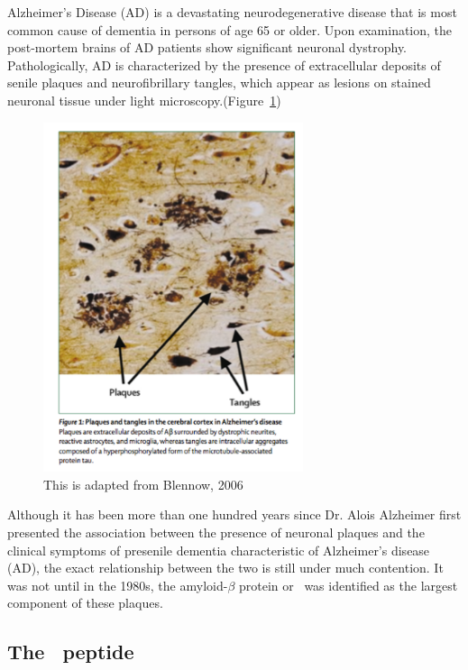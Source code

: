 Alzheimer's Disease (AD) is a devastating neurodegenerative disease that is most common cause of dementia in persons of age 65 or older.  Upon examination, the post-mortem brains of AD patients show significant neuronal dystrophy.  Pathologically, AD is characterized by the presence of extracellular deposits of senile plaques and neurofibrillary tangles, which appear as lesions on stained neuronal tissue under light microscopy.(Figure~\ref{fig:AD_tissue_pathology})

\begin{figure}
  \centering
  \includegraphics[width=3in]{figures/introduction/AD_tissue_pathology.pdf}
  \caption[Image of lesions formed by plaques and NFTs on brain tissue]{This is adapted from Blennow, 2006}
  \label{fig:AD_tissue_pathology}
\end{figure}

Although it has been more than one hundred years since Dr. Alois Alzheimer first presented the association between the presence of neuronal plaques and the clinical symptoms of presenile dementia characteristic of Alzheimer's disease (AD), the exact relationship between the two is still under much contention.  It was not until in the 1980s, the amyloid-$\beta$ protein or \abeta\ was identified as the largest component of these plaques.

\subsection{The \abeta\ peptide}

